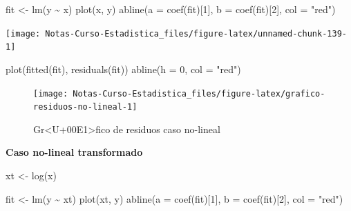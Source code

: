 \documentclass[
  12pt,
]{book}
\newenvironment{Shaded}{\begin{snugshade}}{\end{snugshade}}
\newcommand{\AttributeTok}[1]{\textcolor[rgb]{0.77,0.63,0.00}{#1}}
\newcommand{\DecValTok}[1]{\textcolor[rgb]{0.00,0.00,0.81}{#1}}
\newcommand{\FunctionTok}[1]{\textcolor[rgb]{0.00,0.00,0.00}{#1}}
\newcommand{\NormalTok}[1]{#1}
\newcommand{\OtherTok}[1]{\textcolor[rgb]{0.56,0.35,0.01}{#1}}
\newcommand{\SpecialCharTok}[1]{\textcolor[rgb]{0.00,0.00,0.00}{#1}}
\newcommand{\StringTok}[1]{\textcolor[rgb]{0.31,0.60,0.02}{#1}}
\begin{document}
\begin{example}
\begin{Shaded}
\begin{Highlighting}[]
\NormalTok{fit }\OtherTok{\textless{}{-}} \FunctionTok{lm}\NormalTok{(y }\SpecialCharTok{\textasciitilde{}}\NormalTok{ x)}
\FunctionTok{plot}\NormalTok{(x, y)}
\FunctionTok{abline}\NormalTok{(}\AttributeTok{a =} \FunctionTok{coef}\NormalTok{(fit)[}\DecValTok{1}\NormalTok{], }\AttributeTok{b =} \FunctionTok{coef}\NormalTok{(fit)[}\DecValTok{2}\NormalTok{], }\AttributeTok{col =} \StringTok{"red"}\NormalTok{)}
\end{Highlighting}
\end{Shaded}

\begin{center}\texttt{[image: Notas-Curso-Estadistica\_files/figure-latex/unnamed-chunk-139-1]} \end{center}

\begin{Shaded}
\begin{Highlighting}[]
\FunctionTok{plot}\NormalTok{(}\FunctionTok{fitted}\NormalTok{(fit), }\FunctionTok{residuals}\NormalTok{(fit))}
\FunctionTok{abline}\NormalTok{(}\AttributeTok{h =} \DecValTok{0}\NormalTok{, }\AttributeTok{col =} \StringTok{"red"}\NormalTok{)}
\end{Highlighting}
\end{Shaded}

\begin{figure}

{\centering \texttt{[image: Notas-Curso-Estadistica\_files/figure-latex/grafico-residuos-no-lineal-1]} 

}

\caption{Gr<U+00E1>fico de residuos caso no-lineal}\label{fig:grafico-residuos-no-lineal}
\end{figure}

\textbf{Caso no-lineal transformado}

\begin{Shaded}
\begin{Highlighting}[]
\NormalTok{xt }\OtherTok{\textless{}{-}} \FunctionTok{log}\NormalTok{(x)}


\NormalTok{fit }\OtherTok{\textless{}{-}} \FunctionTok{lm}\NormalTok{(y }\SpecialCharTok{\textasciitilde{}}\NormalTok{ xt)}
\FunctionTok{plot}\NormalTok{(xt, y)}
\FunctionTok{abline}\NormalTok{(}\AttributeTok{a =} \FunctionTok{coef}\NormalTok{(fit)[}\DecValTok{1}\NormalTok{], }\AttributeTok{b =} \FunctionTok{coef}\NormalTok{(fit)[}\DecValTok{2}\NormalTok{], }\AttributeTok{col =} \StringTok{"red"}\NormalTok{)}
\end{Highlighting}
\end{Shaded}


\end{example}
\end{document}
